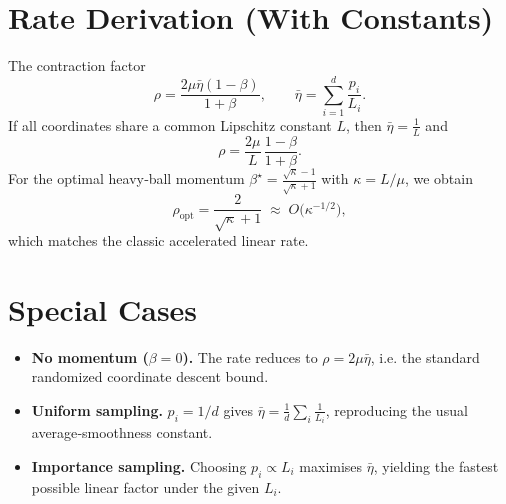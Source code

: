 \documentclass{article}
\begin{document}
\section*{Rate Derivation (With Constants)}
The contraction factor
\[
\rho=\frac{2\mu\bar\eta(1-\beta)}{1+\beta},
\qquad
\bar\eta=\sum_{i=1}^{d}\frac{p_i}{L_i}.
\]
If all coordinates share a common Lipschitz constant $L$, then
$\bar\eta=\frac{1}{L}$ and
\[
\rho=\frac{2\mu}{L}\,\frac{1-\beta}{1+\beta}.
\]
For the optimal heavy‑ball momentum $\beta^{\star}= \frac{\sqrt{\kappa}-1}{\sqrt{\kappa}+1}$
with $\kappa=L/\mu$, we obtain
\[
\rho_{\text{opt}}=
\frac{2}{\sqrt{\kappa}+1}\;\approx\;O\!\bigl(\kappa^{-1/2}\bigr),
\]
which matches the classic accelerated linear rate.

\section*{Special Cases}
\begin{itemize}
    \item \textbf{No momentum ($\beta=0$).} The rate reduces to
          $\rho=2\mu\bar\eta$, i.e. the standard randomized coordinate descent bound.
    \item \textbf{Uniform sampling.} $p_i=1/d$ gives $\bar\eta=\frac{1}{d}\sum_i\frac{1}{L_i}$,
          reproducing the usual average‑smoothness constant.
    \item \textbf{Importance sampling.} Choosing $p_i\propto L_i$ maximises $\bar\eta$,
          yielding the fastest possible linear factor under the given $L_i$.
\end{itemize}
\end{document}
